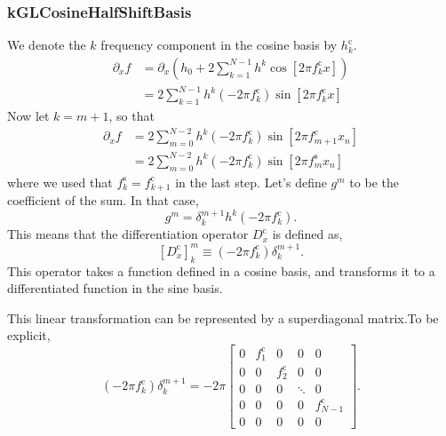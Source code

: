\documentclass[11pt]{article}
\begin{document}
\subsubsection{kGLCosineHalfShiftBasis}

We denote the $k$ frequency component in the cosine basis by $h_k^{\textrm{c}}$.
\begin{align}
\partial_x f&= \partial_x  \left( h_{0} + 2 \sum_{k=1}^{N-1}h^k \cos \left[ 2 \pi f_k^{\textrm{c}} x \right] \right)\\
&= 2 \sum_{k=1}^{N-1} h^k \left( -2 \pi f_k^{\textrm{c}} \right) \sin \left[ 2 \pi f_k^{\textrm{c}} x \right]
\end{align}
Now let $k=m+1$, so that
\begin{align}
\partial_x f &= 2 \sum_{m=0}^{N-2}  h^k \left( -2 \pi f_k^{\textrm{c}} \right)\sin \left[ 2 \pi f_{m+1}^{\textrm{c}} x_n \right] \\
&= 2 \sum_{m=0}^{N-2}  h^k \left( -2 \pi f_k^{\textrm{c}} \right) \sin \left[ 2 \pi f_m^{\textrm{s}} x_n \right]
\end{align}
where we used that $f_k^{\textrm{s}}=f_{k+1}^{\textrm{c}}$ in the last step. Let's define $g^m$ to be the coefficient of the sum. In that case,
\begin{equation}
g^m = \delta^{m+1}_k h^k \left( -2 \pi f_k^{\textrm{c}} \right).
\end{equation}
This means that the differentiation operator $D_x^{\textrm{c}}$ is defined as,
\begin{equation}
\left[D_x^{\textrm{c}}\right]^m_k \equiv \left( -2 \pi f_k^{\textrm{c}} \right) \delta^{m+1}_k.
\end{equation}
This operator takes a function defined in a cosine basis, and transforms it to a differentiated function in the sine basis.

This linear transformation can be represented by a superdiagonal matrix.To be explicit,
\begin{equation}
\left( -2 \pi f_k^{\textrm{c}} \right) \delta^{m+1}_k = -2 \pi \left[\begin{array}{ccccc}0 & f_1^{\textrm{c}} & 0 & 0 & 0 \\0 & 0 & f_2^{\textrm{c}} & 0 & 0 \\0 & 0 & 0 & \ddots & 0 \\0 & 0 & 0 & 0 & f_{N-1}^{\textrm{c}} \\0 & 0 & 0 & 0 & 0\end{array}\right].
\end{equation}
\end{document}
